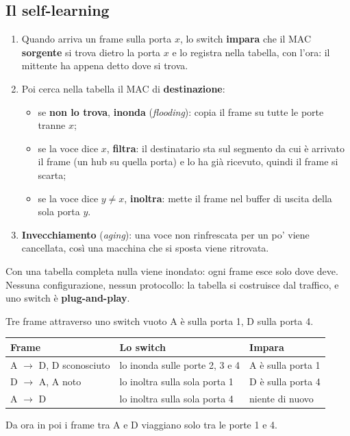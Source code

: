 \subsection{Il self-learning}

\begin{enumerate}
    \item Quando arriva un frame sulla porta $x$, lo switch \textbf{impara} che il MAC \textbf{sorgente} si trova dietro la porta $x$ e lo
          registra nella tabella, con l'ora: il mittente ha appena detto dove si trova.
    \item Poi cerca nella tabella il MAC di \textbf{destinazione}:
    \begin{itemize}
      \item se \textbf{non lo trova}, \textbf{inonda} (\emph{flooding}): copia il frame su tutte le porte tranne $x$;
      \item se la voce dice $x$, \textbf{filtra}: il destinatario sta sul segmento da cui è arrivato il frame (un hub su quella porta)
            e lo ha già ricevuto, quindi il frame si scarta;
      \item se la voce dice $y \neq x$, \textbf{inoltra}: mette il frame nel buffer di uscita della sola porta $y$.
    \end{itemize}
    \item \textbf{Invecchiamento} (\emph{aging}): una voce non rinfrescata per un po' viene cancellata, così una macchina che si sposta
          viene ritrovata.
\end{enumerate}

Con una tabella completa nulla viene inondato: ogni frame esce solo dove deve. Nessuna configurazione, nessun protocollo: la tabella
si costruisce dal traffico, e uno switch è \textbf{plug-and-play}.

\begin{esempio}{Tre frame attraverso uno switch vuoto}
A è sulla porta 1, D sulla porta 4.
\begin{center}
\begin{tabular}{lll}
\toprule
\textbf{Frame} & \textbf{Lo switch} & \textbf{Impara} \\
\midrule
A $\rightarrow$ D, D sconosciuto & lo inonda sulle porte 2, 3 e 4 & A è sulla porta 1 \\
D $\rightarrow$ A, A noto & lo inoltra sulla sola porta 1 & D è sulla porta 4 \\
A $\rightarrow$ D & lo inoltra sulla sola porta 4 & niente di nuovo \\
\bottomrule
\end{tabular}
\end{center}
Da ora in poi i frame tra A e D viaggiano solo tra le porte 1 e 4.
\end{esempio}


